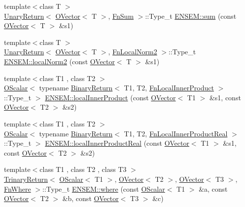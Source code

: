 \begin{DoxyCompactItemize}
{\footnotesize template$<$class T $>$ }\\\mbox{\hyperlink{structENSEM_1_1UnaryReturn}{Unary\+Return}}$<$ \mbox{\hyperlink{classENSEM_1_1OVector}{O\+Vector}}$<$ T $>$, \mbox{\hyperlink{structENSEM_1_1FnSum}{Fn\+Sum}} $>$\+::Type\+\_\+t \mbox{\hyperlink{group__obsvector_gaea84ad793fea0a58204b33a7bcee51b4}{E\+N\+S\+E\+M\+::sum}} (const \mbox{\hyperlink{classENSEM_1_1OVector}{O\+Vector}}$<$ T $>$ \&s1)
\item 
{\footnotesize template$<$class T $>$ }\\\mbox{\hyperlink{structENSEM_1_1UnaryReturn}{Unary\+Return}}$<$ \mbox{\hyperlink{classENSEM_1_1OVector}{O\+Vector}}$<$ T $>$, \mbox{\hyperlink{structENSEM_1_1FnLocalNorm2}{Fn\+Local\+Norm2}} $>$\+::Type\+\_\+t \mbox{\hyperlink{group__obsvector_ga84dbc523abff754a5ecdd0658eb687e1}{E\+N\+S\+E\+M\+::local\+Norm2}} (const \mbox{\hyperlink{classENSEM_1_1OVector}{O\+Vector}}$<$ T $>$ \&s1)
\item 
{\footnotesize template$<$class T1 , class T2 $>$ }\\\mbox{\hyperlink{classENSEM_1_1OScalar}{O\+Scalar}}$<$ typename \mbox{\hyperlink{structENSEM_1_1BinaryReturn}{Binary\+Return}}$<$ T1, T2, \mbox{\hyperlink{structENSEM_1_1FnLocalInnerProduct}{Fn\+Local\+Inner\+Product}} $>$\+::Type\+\_\+t $>$ \mbox{\hyperlink{group__obsvector_gad915d71f08c700574f01f93a9689eb82}{E\+N\+S\+E\+M\+::local\+Inner\+Product}} (const \mbox{\hyperlink{classENSEM_1_1OVector}{O\+Vector}}$<$ T1 $>$ \&s1, const \mbox{\hyperlink{classENSEM_1_1OVector}{O\+Vector}}$<$ T2 $>$ \&s2)
\item 
{\footnotesize template$<$class T1 , class T2 $>$ }\\\mbox{\hyperlink{classENSEM_1_1OScalar}{O\+Scalar}}$<$ typename \mbox{\hyperlink{structENSEM_1_1BinaryReturn}{Binary\+Return}}$<$ T1, T2, \mbox{\hyperlink{structENSEM_1_1FnLocalInnerProductReal}{Fn\+Local\+Inner\+Product\+Real}} $>$\+::Type\+\_\+t $>$ \mbox{\hyperlink{group__obsvector_ga1a740c7927429957c8bc0b75d070bb71}{E\+N\+S\+E\+M\+::local\+Inner\+Product\+Real}} (const \mbox{\hyperlink{classENSEM_1_1OVector}{O\+Vector}}$<$ T1 $>$ \&s1, const \mbox{\hyperlink{classENSEM_1_1OVector}{O\+Vector}}$<$ T2 $>$ \&s2)
\item 
{\footnotesize template$<$class T1 , class T2 , class T3 $>$ }\\\mbox{\hyperlink{structENSEM_1_1TrinaryReturn}{Trinary\+Return}}$<$ \mbox{\hyperlink{classENSEM_1_1OScalar}{O\+Scalar}}$<$ T1 $>$, \mbox{\hyperlink{classENSEM_1_1OVector}{O\+Vector}}$<$ T2 $>$, \mbox{\hyperlink{classENSEM_1_1OVector}{O\+Vector}}$<$ T3 $>$, \mbox{\hyperlink{structENSEM_1_1FnWhere}{Fn\+Where}} $>$\+::Type\+\_\+t \mbox{\hyperlink{group__obsvector_ga0995058bdfadea43373e7142180780a1}{E\+N\+S\+E\+M\+::where}} (const \mbox{\hyperlink{classENSEM_1_1OScalar}{O\+Scalar}}$<$ T1 $>$ \&a, const \mbox{\hyperlink{classENSEM_1_1OVector}{O\+Vector}}$<$ T2 $>$ \&b, const \mbox{\hyperlink{classENSEM_1_1OVector}{O\+Vector}}$<$ T3 $>$ \&c)
\end{DoxyCompactItemize}


